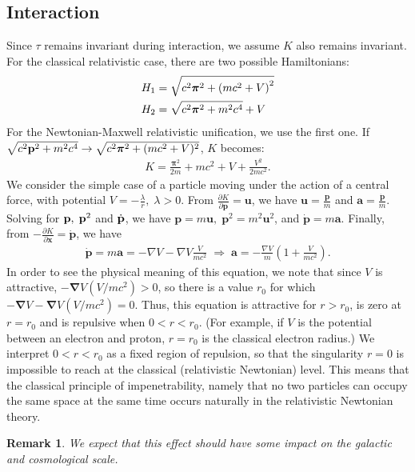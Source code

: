 \documentclass[11pt, reqno]{amsart}
\newcommand{\beqn}{\begin{eqnarray}}
\newcommand{\eeqn}{\end{eqnarray}}
\newcommand{\bs}{\boldsymbol}
\newcommand{\tf}{\tfrac}
\newcommand{\la}{\lambda}
\newcommand{\lb}{\label}
\newtheorem{rem}[thm]{Remark}
\numberwithin{equation}{section}
\begin{document}
\subsection{Interaction}
Since $\tau$ remains invariant during interaction, we assume  $K$ also remains invariant. For the classical relativistic case, there are two possible Hamiltonians:
\[
\begin{gathered}
  {H_1} = \sqrt {{c^2}{{\bs{\pi}}^2} + {{\left( {m{c^2} + V} \right)}^2}}  \hfill \\
  {H_2} = \sqrt {{c^2}{{\bs{\pi}}^2} + {m^2}{c^4}}  + V \hfill \\ 
\end{gathered} 
\]
For the Newtonian-Maxwell relativistic unification, we use the first one. If $\sqrt {{c^2}{{\bf{p}}^2}  + m^2 c^4 }  \to \sqrt {c^2 {\bs{\pi}}^2  + (m c^2 + V)^2}  $,  $K$ becomes:
\beqn
K = \frac{{{\bs\pi ^2}}}{{2m}} + m{c^2} + V + \frac{{{V^2}}}{{2m{c^2}}}.
\eeqn
We consider the simple case of a particle moving under the action of a central force, with potential 
$V=- \tf{\la}{r},\; \la>0$.  From $\tfrac{{\partial K}}{{\partial {\mathbf{p}}}} = {\mathbf{u}}$, we have  ${\mathbf{u}} = \tfrac{{\mathbf{p}}}{{m}}$ and ${\mathbf{a}} = \tfrac{{ \mathbf{\dot p}}}{{m}}$.
Solving for ${\bf{p}}, \;{\bf{p}}^2$ and $\dot{\bf{p}}$, we have 
${\mathbf{p}} = m{\mathbf{u}}, \; {{\mathbf{p}}^2} = {m^2}{{\mathbf{u}}^2}$, and ${\mathbf{\dot p}} = m{\mathbf{a}}$.    
Finally,
from $- \tfrac{{\partial K}}{{\partial {\mathbf{x}}}} = {\mathbf{\dot p}}$, we have
\beqn\lb{h3}
{\mathbf{\dot p}} =m{\mathbf{a}}= - \nabla V-\nabla V \tfrac{V}{{m{c^2}}}\; \Rightarrow \; {\mathbf{a}}=- \tf{\nabla V}{m}(1+ \tfrac{V}{{m{c^2}}}).
\eeqn
In order to see the physical meaning of this equation, we  note that since $V$ is attractive, $-\bs\nabla V (V/mc^2)>0$, so there is a value $r_0$ for which  $-\bs\nabla V   -\bs\nabla V (V/mc^2)=0$.  Thus, this equation is attractive for $r>r_0$, is zero at $r=r_0$ and is repulsive when $0< r< r_0$. (For example, if $V$ is the potential between an electron and proton, $r=r_0$ is the classical electron radius.)  We interpret  $0< r< r_0$ as a fixed region of repulsion, so that the singularity $r=0$ is impossible to reach at the classical (relativistic Newtonian) level.    This means that the classical principle of impenetrability, namely that no two particles can occupy the same space at the same time occurs naturally in the relativistic Newtonian theory.
\begin{rem} We expect that this effect should have some impact on the galactic and cosmological scale. 
\end{rem}
\end{document}

